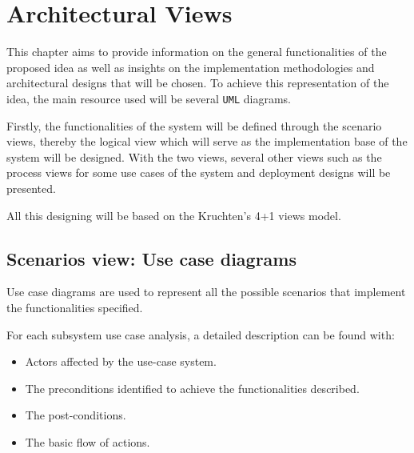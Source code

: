 \section{Architectural Views}
This chapter aims to provide information on the general functionalities of the proposed idea 
as well as insights on the implementation methodologies and architectural designs that will be chosen. 
To achieve this representation of the idea, the main resource used will be several \texttt{UML} diagrams.

Firstly, the functionalities of the system will be defined through the scenario views, thereby the logical 
view which will serve as the implementation base of the system will be designed. 
With the two views, several other views such as the process views for some use cases of the system and 
deployment designs will be presented.

All this designing will be based on the Kruchten’s 4+1 views model\cite{ArchitecturalBlueprints4+1}.

\subsection{Scenarios view: Use case diagrams}

Use case diagrams are used to represent all the possible scenarios that implement the functionalities specified.

For each subsystem use case analysis, a detailed description can be found with:
\begin{itemize}
    \item Actors affected by the use-case system.
    \item The preconditions identified to achieve the functionalities described.
    \item The post-conditions.
    \item The basic flow of actions.
\end{itemize}

